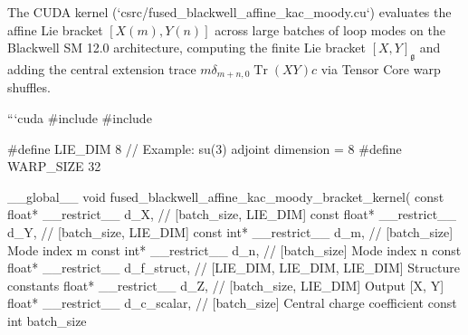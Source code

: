 \documentclass[11pt,twoside,openright]{amsbook}
\begin{document}
The CUDA kernel (`csrc/fused_blackwell_affine_kac_moody.cu`) evaluates the affine Lie bracket $[X(m), Y(n)]$ across large batches of loop modes on the Blackwell SM 12.0 architecture, computing the finite Lie bracket $[X, Y]_{\mathfrak{g}}$ and adding the central extension trace $m \delta_{m+n, 0} \operatorname{Tr}(X Y) c$ via Tensor Core warp shuffles.

```cuda
#include 
#include 

#define LIE_DIM 8  // Example: su(3) adjoint dimension = 8
#define WARP_SIZE 32

__global__ void fused_blackwell_affine_kac_moody_bracket_kernel(
    const float* __restrict__ d_X,        // [batch_size, LIE_DIM]
    const float* __restrict__ d_Y,        // [batch_size, LIE_DIM]
    const int* __restrict__ d_m,          // [batch_size] Mode index m
    const int* __restrict__ d_n,          // [batch_size] Mode index n
    const float* __restrict__ d_f_struct, // [LIE_DIM, LIE_DIM, LIE_DIM] Structure constants
    float* __restrict__ d_Z,              // [batch_size, LIE_DIM] Output [X, Y]
    float* __restrict__ d_c_scalar,       // [batch_size] Central charge coefficient
    const int batch_size
\end{document}
